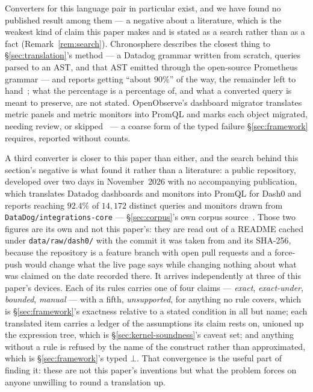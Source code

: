 Converters for this language pair in particular exist, and we have found no published
result among them --- a negative about a literature, which is the weakest kind of claim
this paper makes and is stated as a search rather than as a fact
(Remark~\ref{rem:search}). Chronosphere describes the closest thing to \S\ref{sec:translation}'s method ---
a Datadog grammar written from scratch, queries parsed to an AST, and that AST emitted
through the open-source Prometheus grammar --- and reports getting ``about $90\%$'' of the
way, the remainder left to hand~\citep{marcopoli2024}; what the percentage is a percentage
of, and what a converted query is meant to preserve, are not stated. OpenObserve's
dashboard migrator translates metric panels and metric monitors into PromQL and marks each
object migrated, needing review, or skipped~\citep{openobserve} --- a coarse form of the
typed failure \S\ref{sec:framework} requires, reported without counts.

A third converter is closer to this paper than either, and the search behind this
section's negative is what found it rather than a literature: a public repository,
developed over two days in November~2026 with no accompanying publication, which
translates Datadog dashboards and monitors into PromQL for Dash0 and reports reaching
$92.4\%$ of $14{,}172$ distinct queries and monitors drawn from
\texttt{DataDog/integrations-core} --- \S\ref{sec:corpus}'s own corpus
source~\citep{dd2dash0}. Those two figures are its own and not this paper's: they are
read out of a README cached under \texttt{data/raw/dash0/} with the commit it was taken
from and its SHA-256, because the repository is a feature branch with open pull requests
and a force-push would change what the live page says while changing nothing about what
was claimed on the date recorded there. It arrives independently at three of this paper's devices. Each
of its rules carries one of four claims --- \emph{exact}, \emph{exact-under},
\emph{bounded}, \emph{manual} --- with a fifth, \emph{unsupported}, for anything no
rule covers, which is \S\ref{sec:framework}'s exactness relative to
a stated condition in all but name; each translated item carries a ledger of the
assumptions its claim rests on, unioned up the expression tree, which is
\S\ref{sec:kernel-soundness}'s caveat set; and anything without a rule is refused by the
name of the construct rather than approximated, which is \S\ref{sec:framework}'s typed
$\bot$. That convergence is the useful part of finding it: these are not this paper's
inventions but what the problem forces on anyone unwilling to round a translation up.

